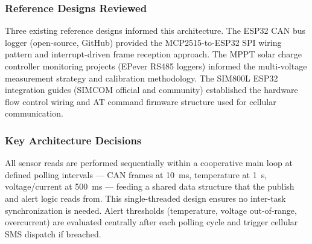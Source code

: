 \subsubsection*{Reference Designs Reviewed}

Three existing reference designs informed this architecture. The ESP32 CAN bus logger (open-source, GitHub) provided the MCP2515-to-ESP32 SPI wiring pattern and interrupt-driven frame reception approach. The MPPT solar charge controller monitoring projects (EPever RS485 loggers) informed the multi-voltage measurement strategy and calibration methodology. The SIM800L ESP32 integration guides (SIMCOM official and community) established the hardware flow control wiring and AT command firmware structure used for cellular communication.

\subsubsection*{Key Architecture Decisions}

All sensor reads are performed sequentially within a cooperative main loop at defined polling intervals --- CAN frames at 10~ms, temperature at 1~s, voltage/current at 500~ms --- feeding a shared data structure that the publish and alert logic reads from. This single-threaded design ensures no inter-task synchronization is needed. Alert thresholds (temperature, voltage out-of-range, overcurrent) are evaluated centrally after each polling cycle and trigger cellular SMS dispatch if breached.
